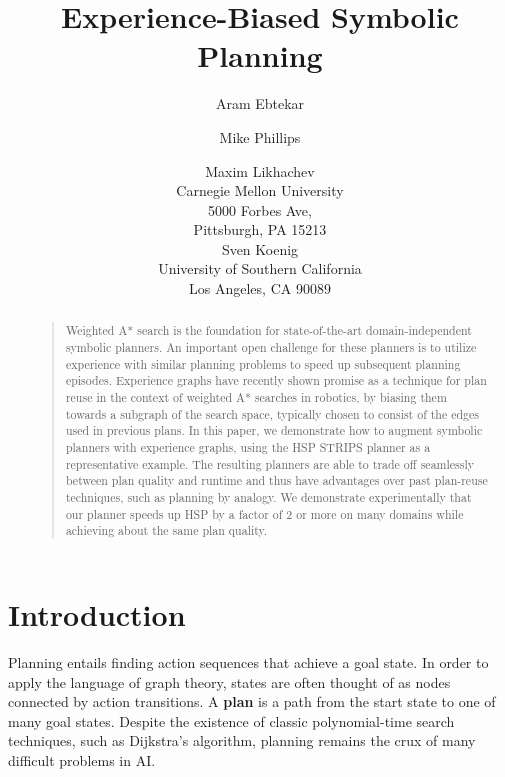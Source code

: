 \documentclass[letterpaper]{article}
\begin{document}
%
\title{Experience-Biased Symbolic Planning}
\author{Aram Ebtekar \and Mike Phillips \and Maxim Likhachev\\
Carnegie Mellon University\\
5000 Forbes Ave,\\
Pittsburgh, PA 15213\\
\And Sven Koenig\\
University of Southern California\\
Los Angeles, CA 90089
}
\maketitle
\begin{abstract}
\begin{quote}
Weighted A* search is the foundation for state-of-the-art domain-independent symbolic planners.
An important open challenge for these planners is to utilize experience with similar planning problems to speed up subsequent planning episodes.
Experience graphs have recently shown promise as a technique for plan reuse in the context of weighted A* searches in robotics, by biasing them towards a subgraph of the search space, typically chosen to consist of the edges used in previous plans.
In this paper, we demonstrate how to augment symbolic planners with
experience graphs, using the HSP STRIPS planner as a representative
example.
The resulting planners are able to trade off seamlessly
between plan quality and runtime and thus have advantages over past
plan-reuse techniques, such as planning by analogy.
We demonstrate
experimentally that our planner speeds up HSP by a factor of 2 or more on
many domains while achieving about the same plan quality.
\end{quote}
\end{abstract}

\section{Introduction}
Planning entails finding action sequences that achieve a goal state.
In order to apply the language of graph theory, states are often thought of as nodes connected by action transitions.
A \textbf{plan} is a path from the start state to one of many goal states.
Despite the existence of classic polynomial-time search techniques, such as Dijkstra's algorithm, planning remains the crux of many difficult problems in AI.
\end{document}
